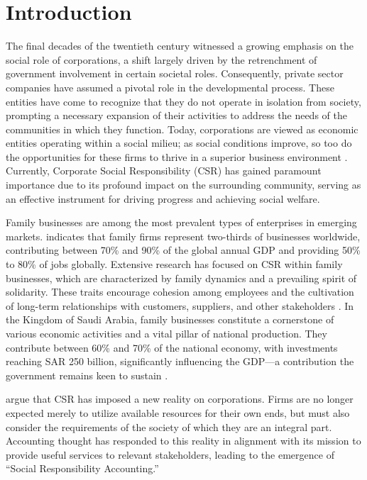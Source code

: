 \documentclass{NSP1}
\begin{document}
\vspace{1mm}
\noindent{\color{rulecolor}\rule{\textwidth}{1pt}}
\vspace{3mm}


\section{Introduction}
The final decades of the twentieth century witnessed a growing emphasis on the social role of corporations, a shift largely driven by the retrenchment of government involvement in certain societal roles. Consequently, private sector companies have assumed a pivotal role in the developmental process. These entities have come to recognize that they do not operate in isolation from society, prompting a necessary expansion of their activities to address the needs of the communities in which they function. Today, corporations are viewed as economic entities operating within a social milieu; as social conditions improve, so too do the opportunities for these firms to thrive in a superior business environment \cite{ref1}. Currently, Corporate Social Responsibility (CSR) has gained paramount importance due to its profound impact on the surrounding community, serving as an effective instrument for driving progress and achieving social welfare.

Family businesses are among the most prevalent types of enterprises in emerging markets. \cite{ref8} indicates that family firms represent two-thirds of businesses worldwide, contributing between 70\% and 90\% of the global annual GDP and providing 50\% to 80\% of jobs globally. Extensive research has focused on CSR within family businesses, which are characterized by family dynamics and a prevailing spirit of solidarity. These traits encourage cohesion among employees and the cultivation of long-term relationships with customers, suppliers, and other stakeholders \cite{ref6}. In the Kingdom of Saudi Arabia, family businesses constitute a cornerstone of various economic activities and a vital pillar of national production. They contribute between 60\% and 70\% of the national economy, with investments reaching SAR 250 billion, significantly influencing the GDP---a contribution the government remains keen to sustain \cite{ref7}.

\cite{ref2} argue that CSR has imposed a new reality on corporations. Firms are no longer expected merely to utilize available resources for their own ends, but must also consider the requirements of the society of which they are an integral part. Accounting thought has responded to this reality in alignment with its mission to provide useful services to relevant stakeholders, leading to the emergence of ``Social Responsibility Accounting.''
\end{document}
